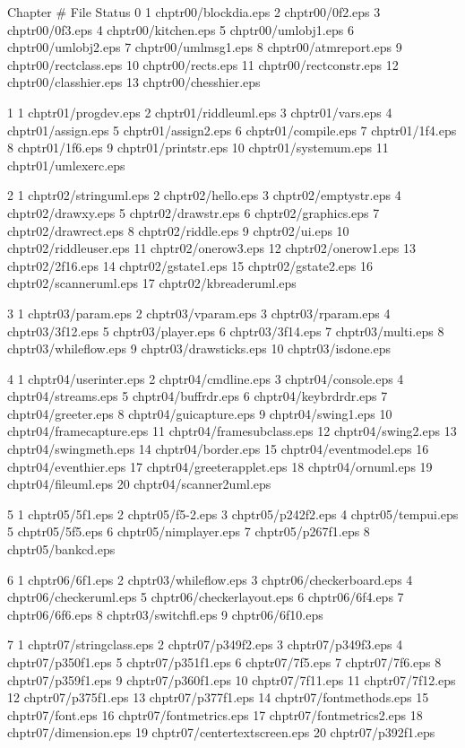 Chapter	#	File			Status
0       1	chptr00/blockdia.eps
	2	chptr00/0f2.eps
	3	chptr00/0f3.eps
	4	chptr00/kitchen.eps
	5	chptr00/umlobj1.eps
	6	chptr00/umlobj2.eps
	7	chptr00/umlmsg1.eps
	8	chptr00/atmreport.eps
	9	chptr00/rectclass.eps
	10	chptr00/rects.eps
	11	chptr00/rectconstr.eps
	12	chptr00/classhier.eps
	13	chptr00/chesshier.eps

1	1	chptr01/progdev.eps
	2	chptr01/riddleuml.eps
	3	chptr01/vars.eps
	4	chptr01/assign.eps
	5	chptr01/assign2.eps
	6	chptr01/compile.eps
	7	chptr01/1f4.eps
	8	chptr01/1f6.eps
	9	chptr01/printstr.eps
	10	chptr01/systemum.eps
	11	chptr01/umlexerc.eps

2	1	chptr02/stringuml.eps
	2	chptr02/hello.eps
	3	chptr02/emptystr.eps
	4	chptr02/drawxy.eps
	5	chptr02/drawstr.eps
	6	chptr02/graphics.eps
	7	chptr02/drawrect.eps
	8	chptr02/riddle.eps
	9	chptr02/ui.eps
	10	chptr02/riddleuser.eps
	11	chptr02/onerow3.eps
	12	chptr02/onerow1.eps
	13	chptr02/2f16.eps
	14	chptr02/gstate1.eps
	15	chptr02/gstate2.eps
	16	chptr02/scanneruml.eps
	17	chptr02/kbreaderuml.eps

3	1	chptr03/param.eps
	2	chptr03/vparam.eps
	3	chptr03/rparam.eps
	4	chptr03/3f12.eps
	5	chptr03/player.eps
	6	chptr03/3f14.eps
	7	chptr03/multi.eps
	8	chptr03/whileflow.eps
	9	chptr03/drawsticks.eps
	10	chptr03/isdone.eps

4	1	chptr04/userinter.eps
	2	chptr04/cmdline.eps
	3	chptr04/console.eps
	4	chptr04/streams.eps
	5	chptr04/buffrdr.eps
	6	chptr04/keybrdrdr.eps
	7	chptr04/greeter.eps
	8	chptr04/guicapture.eps
	9	chptr04/swing1.eps
	10	chptr04/framecapture.eps
	11	chptr04/framesubclass.eps
	12	chptr04/swing2.eps
	13	chptr04/swingmeth.eps
	14	chptr04/border.eps
	15	chptr04/eventmodel.eps
	16	chptr04/eventhier.eps
	17	chptr04/greeterapplet.eps
	18	chptr04/ornuml.eps
	19	chptr04/fileuml.eps
	20	chptr04/scanner2uml.eps

5	1	chptr05/5f1.eps
	2	chptr05/f5-2.eps
	3	chptr05/p242f2.eps
	4	chptr05/tempui.eps
	5	chptr05/5f5.eps
	6	chptr05/nimplayer.eps
	7	chptr05/p267f1.eps
	8	chptr05/bankcd.eps

6	1	chptr06/6f1.eps
	2	chptr03/whileflow.eps
	3	chptr06/checkerboard.eps
	4	chptr06/checkeruml.eps
	5	chptr06/checkerlayout.eps
	6	chptr06/6f4.eps
	7	chptr06/6f6.eps
	8	chptr03/switchfl.eps
	9	chptr06/6f10.eps

7	1	chptr07/stringclass.eps
	2	chptr07/p349f2.eps
	3	chptr07/p349f3.eps
	4	chptr07/p350f1.eps
	5	chptr07/p351f1.eps
	6	chptr07/7f5.eps
	7	chptr07/7f6.eps
	8	chptr07/p359f1.eps
	9	chptr07/p360f1.eps
	10	chptr07/7f11.eps
	11	chptr07/7f12.eps
	12	chptr07/p375f1.eps
	13	chptr07/p377f1.eps
	14	chptr07/fontmethods.eps
	15	chptr07/font.eps
	16	chptr07/fontmetrics.eps
	17	chptr07/fontmetrics2.eps
	18	chptr07/dimension.eps
	19	chptr07/centertextscreen.eps
	20	chptr07/p392f1.eps

